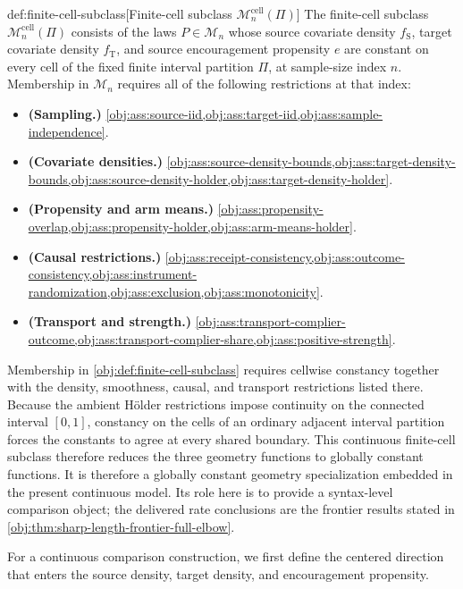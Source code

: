 \documentclass[11pt]{article}
\begin{document}
\begin{definitionv}{def:finite-cell-subclass}[Finite-cell subclass $\mathcal M_n^{\mathrm{cell}}(\Pi)$]
The finite-cell subclass \(\mathcal M_n^{\mathrm{cell}}(\Pi)\) consists of the laws \(P\in\mathcal M_n\) whose source covariate density \(f_{\mathrm S}\), target covariate density \(f_{\mathrm T}\), and source encouragement propensity \(e\) are constant on every cell of the fixed finite interval partition \(\Pi\), at sample-size index \(n\). Membership in \(\mathcal M_n\) requires all of the following restrictions at that index:
\begin{itemize}
\item \textbf{(Sampling.)} \cref{obj:ass:source-iid,obj:ass:target-iid,obj:ass:sample-independence}.
\item \textbf{(Covariate densities.)} \cref{obj:ass:source-density-bounds,obj:ass:target-density-bounds,obj:ass:source-density-holder,obj:ass:target-density-holder}.
\item \textbf{(Propensity and arm means.)} \cref{obj:ass:propensity-overlap,obj:ass:propensity-holder,obj:ass:arm-means-holder}.
\item \textbf{(Causal restrictions.)} \cref{obj:ass:receipt-consistency,obj:ass:outcome-consistency,obj:ass:instrument-randomization,obj:ass:exclusion,obj:ass:monotonicity}.
\item \textbf{(Transport and strength.)} \cref{obj:ass:transport-complier-outcome,obj:ass:transport-complier-share,obj:ass:positive-strength}.
\end{itemize}
\end{definitionv}

Membership in \cref{obj:def:finite-cell-subclass} requires cellwise constancy together with the density, smoothness, causal, and transport restrictions listed there. Because the ambient Hölder restrictions impose continuity on the connected interval \([0,1]\), constancy on the cells of an ordinary adjacent interval partition forces the constants to agree at every shared boundary. This continuous finite-cell subclass therefore reduces the three geometry functions to globally constant functions. It is therefore a globally constant geometry specialization embedded in the present continuous model. Its role here is to provide a syntax-level comparison object; the delivered rate conclusions are the frontier results stated in \cref{obj:thm:sharp-length-frontier-full-elbow}.

For a continuous comparison construction, we first define the centered direction that enters the source density, target density, and encouragement propensity.
\end{document}
